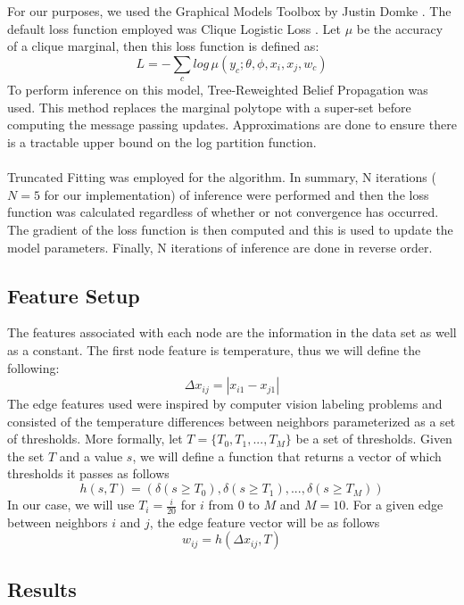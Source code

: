 For our purposes, we used the Graphical Models Toolbox by Justin Domke \cite{domkeToolbox}. The default loss function employed was Clique Logistic Loss \cite{Domke13}.  Let $\mu$ be the accuracy of a clique marginal, then this loss function is defined as:
\[
L = - \sum_c {log \, \mu(y_c; \theta, \phi, x_i, x_j, w_c)}
\]
To perform inference on this model, Tree-Reweighted Belief Propagation was used. This method replaces the marginal polytope with a super-set before computing the message passing updates. Approximations are done to ensure there is a tractable upper bound on the log partition function. \\
\\
Truncated Fitting was employed for the algorithm. In summary, N iterations ($N=5$ for our implementation) of inference were performed and then the loss function was calculated regardless of whether or not convergence has occurred. The gradient of the loss function is then computed and this is used to update the model parameters. Finally, N iterations of inference are done in reverse order. 

\subsection{Feature Setup}

The features associated with each node are the information in the data set as well as a constant. The first node feature is temperature, thus we will define the following:
\[
\Delta x_{ij} = |x_{i1} - x_{j1}|
\]
The edge features used were inspired by computer vision labeling problems and consisted of the temperature differences between neighbors parameterized as a set of thresholds. More formally, let $T = \{ T_0 , T_1, ..., T_M \}$ be a set of thresholds. Given the set $T$ and a value $s$, we will define a function that returns a vector of which thresholds it passes as follows
\[
h(s,T) = ( \delta (s \geq T_0), \delta (s \geq T_1), ..., \delta (s \geq T_M))
\]
In our case, we will use $T_i = \frac{i}{20}$ for $i$ from $0$ to $M$ and $M=10$. For a given edge between neighbors $i$ and $j$, the edge feature vector will be as follows
\[
w_{ij} = h( \Delta x_{ij}, T)
\] 

\subsection{Results}


